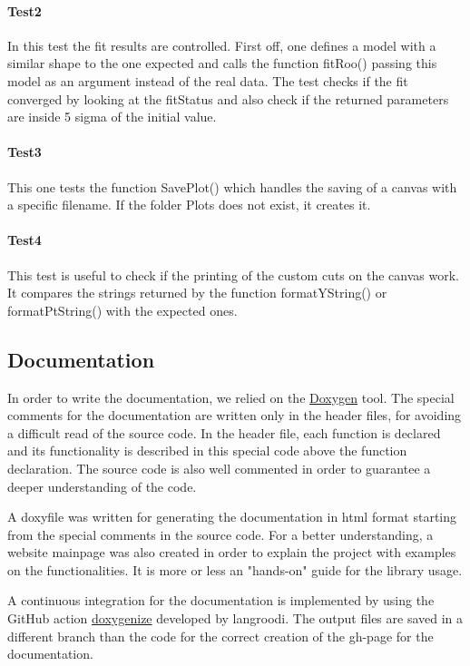 \documentclass[a4paper,11pt]{article}
\begin{document}
\paragraph{Test2}In this test the fit results are controlled. First off, one defines a model with a similar shape to the one expected and calls the function fitRoo() passing this model as an argument instead of the real data. The test checks if the fit converged by looking at the fitStatus and also check if the returned parameters are inside 5 sigma of the initial value.

\paragraph{Test3} This one tests the function SavePlot() which handles the saving of a canvas with a specific filename. If the folder Plots does not exist, it creates it.

\paragraph{Test4} This test is useful to check if the printing of the custom cuts on the canvas work. It compares the strings returned by the function formatYString() or formatPtString() with the expected ones.

\subsection{Documentation}
In order to write the documentation, we relied on the \href{https://www.doxygen.nl}{Doxygen} tool. The special comments for the documentation are written only in the header files, for avoiding a difficult read of the source code. In the header file, each function is declared and its functionality is described in this special code above the function declaration.
The source code is also well commented in order to guarantee a deeper understanding of the code. 

A doxyfile was written for generating the documentation in html format starting from the special comments in the source code. For a better understanding, a website mainpage was also created in order to explain the project with examples on the functionalities. It is more or less an "hands-on" guide for the library usage.

A continuous integration for the documentation is implemented by using the GitHub action \href{https://github.com/langroodi/doxygenize}{doxygenize} developed by langroodi. The output files are saved in a different branch than the code for the correct creation of the gh-page for the documentation.
\end{document}
